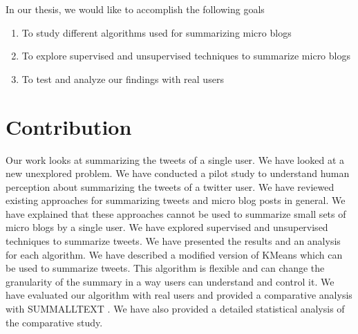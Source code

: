 In our thesis, we would like to accomplish the following goals
\begin{enumerate}
\item To study different algorithms used for summarizing micro blogs
\item To explore supervised and unsupervised techniques to summarize micro blogs
\item To test and analyze our findings with real users
\end{enumerate}

\section{Contribution}

Our work looks at summarizing the tweets of a single user.  We have looked at a new unexplored problem. We have conducted a pilot study to understand human perception about summarizing the tweets of a twitter user. We have reviewed existing approaches for summarizing tweets and micro blog posts in general. We have explained that these approaches cannot be used to summarize small sets of micro blogs by a single user. We have explored supervised and unsupervised techniques to summarize tweets. We have presented the results and an analysis for each algorithm. We have described a modified version of KMeans which can be used to summarize tweets. This algorithm is flexible and can change the granularity of the summary in a way users can understand and control it. We have evaluated our algorithm with real users and provided a comparative analysis with SUMMALLTEXT \cite{DBLP:conf/icwsm/ChakrabartiP11}. We have also provided a detailed statistical analysis of the comparative study.




